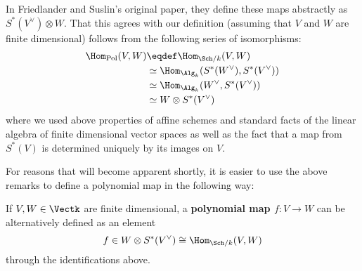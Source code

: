 \documentclass[12pt]{article}
\begin{document}
\begin{rmk}
	In Friedlander and Suslin's original paper, they define these maps abstractly as $S^\ast(V^\vee)\otimes W$. That this 
	agrees with our definition (assuming that $V$ and $W$ are finite dimensional) follows from the following series of isomorphisms:
	\begin{align*}
		\Hom_\text{Pol}(V,W)&\eqdef\Hom_{\Sch/k}(V,W)\\
		&\simeq\Hom_{\Alg_k}(S^\ast(W^\vee),S^\ast(V^\vee))\\
		&\simeq\Hom_{\Alg_k}(W^\vee,S^\ast(V^\vee))\\
		&\simeq W\otimes S^\ast(V^\vee)
	\end{align*}
	where we used above properties of affine schemes and standard facts of the linear algebra of finite dimensional vector spaces as well as the fact that 
	a map from $S^\ast(V)$ is determined uniquely by its images on $V$.
\end{rmk}
For reasons that will become apparent shortly, it is easier to use the above remarks to define a 
polynomial map in the following way:
\begin{defn}
	If $V,W\in\Vectk$ are finite dimensional, a \textbf{polynomial map $f:V\to W$} can be alternatively defined as an element 
	\[f\in W\otimes S^\ast(V^\vee)\cong\Hom_{\Sch/k}(V,W)\]
	through the identifications above.
\end{defn}
\end{document}
